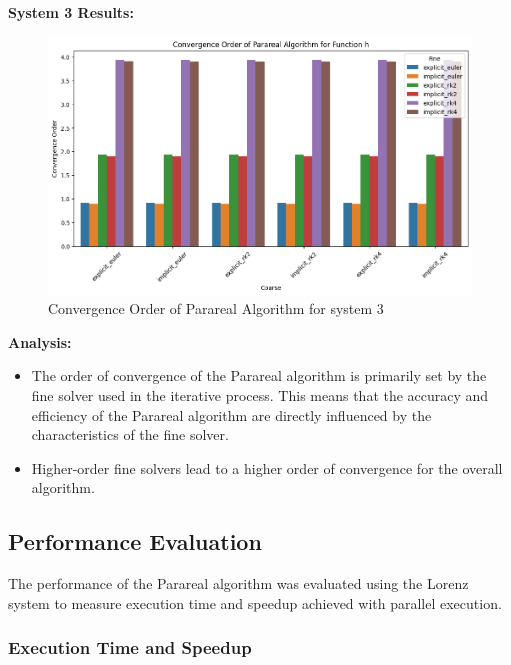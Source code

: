\documentclass[a4paper,12pt,french]{article}
\begin{document}
\textbf{System 3 Results:}
\begin{figure}[ht!]
    \centering
    \includegraphics[width=.92\textwidth]{img/cv_ord_h.png}
    \caption{Convergence Order of Parareal Algorithm for system 3}
    \label{fig:6}
\end{figure}

\textbf{Analysis:}
\begin{itemize}
    \item The order of convergence of the Parareal algorithm is primarily set by the fine solver used in the iterative process. This means that the accuracy and efficiency of the Parareal algorithm are directly influenced by the characteristics of the fine solver.
    \item  Higher-order fine solvers lead to a higher order of convergence for the overall algorithm.
\end{itemize}

\subsection{Performance Evaluation}
The performance of the Parareal algorithm was evaluated using the Lorenz system to measure execution time and speedup achieved with parallel execution.
\subsubsection{Execution Time and Speedup}
\end{document}
